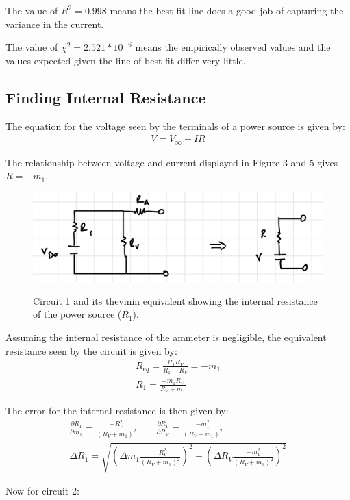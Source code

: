 \documentclass[12pt]{article}
\begin{document}
The value of $R^2 = 0.998$ means the best fit line does a good job of capturing the variance in the current.

The value of $\chi^2 = 2.521 * 10^{-6}$ means the empirically observed values and the values expected given the line of best fit differ very little.

\subsection*{Finding Internal Resistance}
The equation for the voltage seen by the terminals of a power source is given by:
\begin{align}
    V = V_{\infty} - IR
\end{align}

The relationship between voltage and current displayed in Figure 3 and 5 gives $R = -m_1$.

\begin{figure}[H]
    \begin{centering}
    \includegraphics[width=0.5 \textwidth]{img/thev_1.jpeg}
    \label{fig:thev1}
    \caption{Circuit 1 and its thevinin equivalent showing the internal resistance of the power source ($R_1$).}
    \end{centering}
\end{figure}

Assuming the internal resistance of the ammeter is negligible, the equivalent resistance seen by the circuit is given by:
\begin{align}
    R_{eq} = \frac{R_1R_V}{R_1 + R_V} = -m_1 \\
    R_1 = \frac{-m_1R_V}{R_V + m_1}
\end{align}

The error for the internal resistance is then given by:
\begin{align}
    \frac{\partial R_1}{\partial m_1} = \frac{-R_V^2}{(R_V + m_1)^2} \qquad
    \frac{\partial R_1}{\partial R_V} = \frac{-m_1^2}{(R_V + m_1)^2} \qquad \\
    \Delta R_1 = \sqrt{\left(\Delta m_1 \frac{-R_V^2}{(R_V + m_1)^2}\right)^2 + \left(\Delta R_V \frac{-m_1^2}{(R_V + m_1)^2}\right)^2}
\end{align}

Now for circuit 2:
\end{document}
